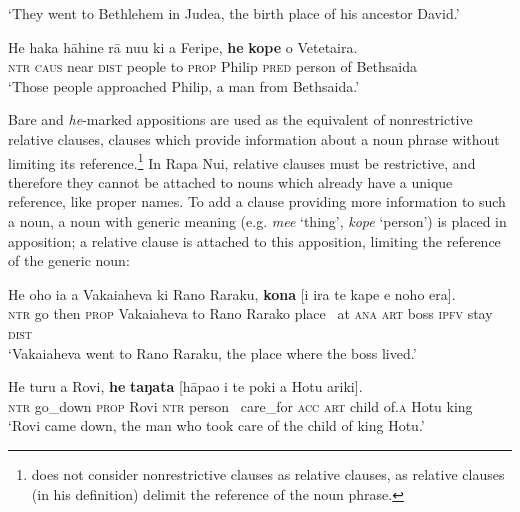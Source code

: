 \glt 
‘They went to Bethlehem in Judea, the birth place of his ancestor David.’ \textstyleExampleref{[Luk. 2:4]}
\z

\ea\label{ex:5.169}
\gll He haka hāhine rā nu{\ꞌ}u ki a Feripe, \textbf{he} \textbf{kope} o Vetetaira. \\
\textsc{ntr} \textsc{caus} near \textsc{dist} people to \textsc{prop} Philip \textsc{pred} person of Bethsaida \\

\glt 
‘Those people approached Philip, a man from Bethsaida.’ \textstyleExampleref{[John 12:21]}
\z

Bare and \textit{he}{}-marked appositions are used as the equivalent of nonrestrictive relative clauses, clauses which provide information about a noun phrase without limiting its reference.\footnote{\label{fn:276}\citet[207]{Andrews2007Relative} does not consider nonrestrictive clauses as relative clauses, as relative clauses (in his definition) delimit the reference of the noun phrase.} In Rapa Nui, relative clauses must be restrictive, and therefore they cannot be attached to nouns which already have a unique reference, like proper names. To add a clause providing more information to such a noun, a noun with generic meaning (e.g. \textit{me{\ꞌ}e} ‘thing’, \textit{kope} ‘person’) is placed in apposition; a relative clause is attached to this apposition, limiting the reference of the generic noun:

\ea\label{ex:5.170}
\gll He oho ia a Vakaiaheva ki Rano Raraku, \textbf{kona} [{\ꞌ}i ira te kape  e noho era].\\
\textsc{ntr} go then \textsc{prop} Vakaiaheva to Rano Rarako place ~at \textsc{ana} \textsc{art} boss  \textsc{ipfv} stay \textsc{dist}\\

\glt 
‘Vakaiaheva went to Rano Raraku, the place where the boss lived.’ \textstyleExampleref{[R440.028]} 
\z

\ea\label{ex:5.171}
\gll He turu a Rovi, \textbf{he} \textbf{taŋata} [hāpa{\ꞌ}o i te poki {\ꞌ}a Hotu {\ꞌ}ariki]. \\
\textsc{ntr} go\_down \textsc{prop} Rovi \textsc{ntr} person ~care\_for \textsc{acc} \textsc{art} child of\textsc{.a} Hotu king \\

\glt 
‘Rovi came down, the man who took care of the child of king Hotu.’ \textstyleExampleref{[R422.002]} 
\z

